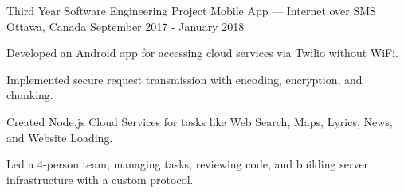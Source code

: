 
\begin{cventries}
	\cventry
		{Third Year Software Engineering Project}
		{Mobile App --- Internet over SMS}
		{Ottawa, Canada}
		{September 2017 - January 2018}
		{\begin{cvitems}
			\item Developed an Android app for accessing cloud services via Twilio without WiFi.
			\item Implemented secure request transmission with encoding, encryption, and chunking.
			\item Created Node.js Cloud Services for tasks like Web Search, Maps, Lyrics, News, and Website Loading.
			\item Led a 4-person team, managing tasks, reviewing code, and building server infrastructure with a custom protocol.
		\end{cvitems}}
\end{cventries}
